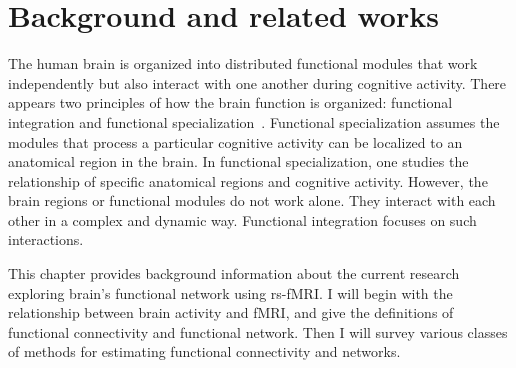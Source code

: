 \chapter{Background and related works}
\label{chap:bg}

The human brain is organized into distributed functional modules that work
independently but also interact with one another during cognitive
activity. There appears two principles of how the brain function is organized:
functional integration and functional
specialization~\cite{friston2007statistical}. Functional specialization assumes
the modules that process a particular cognitive activity can be localized to an
anatomical region in the brain. In functional specialization, one studies the
relationship of specific anatomical regions and cognitive activity. However, the
brain regions or functional modules do not work alone. They interact with each
other in a complex and dynamic way. Functional integration focuses on such
interactions.

This chapter provides background information about the current research
exploring brain's functional network using rs-fMRI. I will begin with the
relationship between brain activity and fMRI, and give the definitions of
functional connectivity and functional network. Then I will survey various
classes of methods for estimating functional connectivity and networks.

